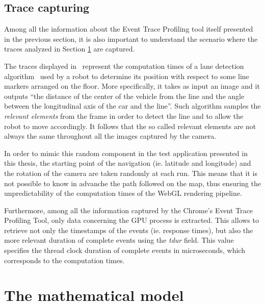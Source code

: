 \subsection{Trace capturing}
Among all the information about the Event Trace Profiling tool itself presented
in the previous section, it is
also important to understand the scenario where the traces analyzed in Section
\ref{sec:math_model} are captured.

The traces displayed in~\cite{frias2017probabilistic} represent the computation
times of a lane detection algorithm~\cite{fontanelli2014vision} used by a robot
to determine its position with respect to some line markers arranged on the floor.
More specifically, it takes as input an image and it outputs ``the distance
of the center of the vehicle from the line and the angle between the longitudinal
axis of the car and the line''. Such algorithm samples the \emph{relevant elements}
from the frame in order to detect the line and to allow the robot to move accordingly.
It follows that the so called relevant elements are not always the same throughout
all the images captured by the camera.

In order to mimic this random component in the test application presented in this
thesis, the starting point of the navigation (ie. latitude and longitude) and
the rotation of the camera are taken randomly at each run.
This means that it is not possible to know in advanche the path followed on the
map, thus ensuring the unpredictability of the computation times of the WebGL
rendering pipeline.

Furthermore, among all the information captured by the
Chrome's Event Trace Profiling Tool, only data concerning the GPU process is
extracted. This allows to retrieve not only the timestamps of the events (ie.
response times), but also the more relevant duration of complete events using
the \emph{tdur} field. This value specifies the thread clock duration of complete
events in microseconds, which corresponds to the computation times.


\section{The mathematical model}\label{sec:math_model}

